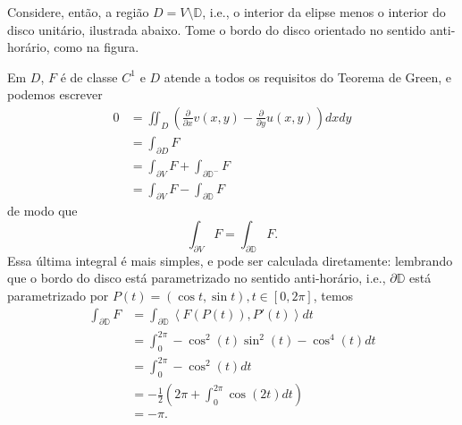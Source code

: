 \documentclass[12pt,a4paper]{article}
\begin{document}
\begin{enumerate}
	Considere, então, a região $D = V\setminus\mathbb{D}$, i.e., o interior da elipse menos o interior do disco unitário, ilustrada abaixo. Tome o bordo do disco orientado no sentido anti-horário, como na figura.
	
	\begin{figure}[h!]
		\centering
	\end{figure}
	\par Em $D$, $F$ é de classe $C^1$ e $D$ atende a todos os requisitos do Teorema de Green, e podemos escrever
	\begin{align*}
	0 &= \iint_D \left( \frac{\partial}{\partial x}v(x,y) - \frac{\partial}{\partial y}u(x,y) \right)dxdy \\
	&= \int_{\partial D} F \\
	&= \int_{\partial V} F + \int_{\partial\mathbb{D}^{-}}F \\
	&= \int_{\partial V} F - \int_{\partial\mathbb{D}}F 
	\end{align*}
	de modo que
	$$
	\int_{\partial V} F = \int_{\partial\mathbb{D}}F.
	$$
	Essa última integral é mais simples, e pode ser calculada diretamente: lembrando que o bordo do disco está parametrizado no sentido anti-horário, i.e., $\partial\mathbb{D}$ está parametrizado por $P(t) = (\cos t, \sin t), t\in[0,2\pi]$, temos
	\begin{align*}
	\int_{\partial\mathbb{D}}F &= \int_{\partial\mathbb{D}} \left\langle F(P(t)), P'(t) \right\rangle dt \\
	&= \int_{0}^{2\pi} -\cos^2(t)\sin^2(t) - \cos^4(t) dt \\
	&= \int_{0}^{2\pi} -\cos^2(t)dt \\
	&= -\frac{1}{2}\left( 2\pi + \int_{0}^{2\pi}\cos(2t)dt \right) \\
	&= -\pi. 
	\end{align*}
	

\end{enumerate}
\end{document}
